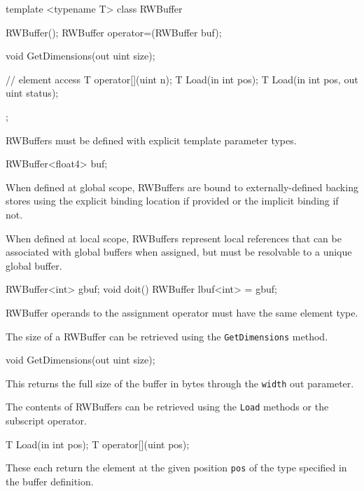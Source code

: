 \begin{HLSL}
template <typename T>
 class RWBuffer {

   RWBuffer();
   RWBuffer operator=(RWBuffer buf);

   void GetDimensions(out uint size);

   // element access
   T operator[](uint n);
   T Load(in int pos);
   T Load(in int pos, out uint status);
};
\end{HLSL}


RWBuffers must be defined with explicit template parameter types.
\begin{HLSL}
  RWBuffer<float4> buf;
\end{HLSL}

When defined at global scope, RWBuffers are bound to externally-defined backing stores
using the explicit binding location if provided or the implicit binding if not.

When defined at local scope, RWBuffers represent local references
that can be associated with global buffers when assigned,
but must be resolvable to a unique global buffer.

\begin{HLSL}
  RWBuffer<int> gbuf;
  void doit() {
    RWBuffer lbuf<int> = gbuf;
  }
\end{HLSL}
RWBuffer operands to the assignment operator must have the same element type.


The size of a RWBuffer can be retrieved using the \texttt{GetDimensions} method.
\begin{HLSL}
void GetDimensions(out uint size);
\end{HLSL}

This returns the full size of the buffer in bytes through the \texttt{width} out parameter.


The contents of RWBuffers can be retrieved using the \texttt{Load} methods
or the subscript operator.

\begin{HLSL}
 T Load(in int pos);
 T operator[](uint pos);
\end{HLSL}

These each return the element at the given position \texttt{pos} of the type specified in the buffer definition.

